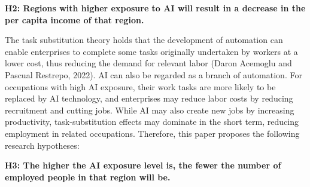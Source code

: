 \documentclass[11pt,a4paper]{article}
\begin{document}
\noindent\textbf{H2: Regions with higher exposure to AI will result in a decrease in the per capita income of that region.}\par
The task substitution theory holds that the development of automation can enable enterprises to complete some tasks originally undertaken by workers at a lower cost, thus reducing the demand for relevant labor (Daron Acemoglu and Pascual Restrepo, 2022). AI can also be regarded as a branch of automation. For occupations with high AI exposure, their work tasks are more likely to be replaced by AI technology, and enterprises may reduce labor costs by reducing recruitment and cutting jobs. While AI may also create new jobs by increasing productivity, task-substitution effects may dominate in the short term, reducing employment in related occupations. Therefore, this paper proposes the following research hypotheses:

\noindent\textbf{H3: The higher the AI exposure level is, the fewer the number of employed people in that region will be.}\par
\begin{table}[H]
\centering
\caption{Descriptive Statistics}
\label{tab:descriptive}
\small
\renewcommand{\arraystretch}{1.06}
\end{table}
\end{document}
